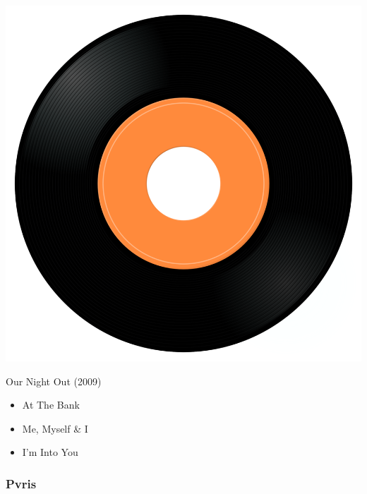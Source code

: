 \begin{minipage}[t]{0.25\textwidth}
\captionsetup{type=figure}
\includegraphics[width=\textwidth]{Images/cover.png}
\caption*{Our Night Out (2009)}
\end{minipage}
\begin{minipage}[t]{0.25\textwidth}\vspace{0pt}
\begin{itemize}[nosep,leftmargin=1em,labelwidth=*,align=left]
	\setlength{\itemsep}{0pt}
	\item At The Bank 
	\item Me, Myself \& I
	\item I'm Into You
\end{itemize}
\end{minipage}

\subsubsection{Pvris}

